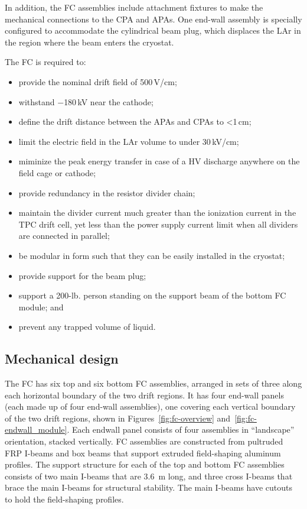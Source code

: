 In addition, the FC assemblies include attachment fixtures to make the mechanical connections to the CPA and APAs.
One end-wall assembly is specially configured to accommodate the
cylindrical beam plug, which displaces the LAr in the region where the beam enters the cryostat.

The FC is required to:
\begin{itemize}
\item provide the nominal drift field of 500\,V/cm;
\item withstand $-$180\,kV near the cathode;
\item define the drift distance between the APAs and CPAs to <1\,cm;
\item limit the electric field in the LAr volume to under 30\,kV/cm;
\item miminize the peak energy transfer in case of a HV discharge anywhere on the field cage or cathode;
\item provide redundancy in the resistor divider chain;
\item maintain the divider current much greater than the ionization current in the TPC drift cell, yet less than the power supply current limit when all dividers are connected in parallel;
\item be modular in form such that they can be easily installed in the cryostat;
\item provide support for the beam plug; 
\item support a 200-lb. person standing on the support beam of the bottom FC module; and
\item prevent any trapped volume of liquid.
\end{itemize}

\subsection{Mechanical design}

The FC has six top and six bottom FC assemblies, arranged in sets of three along each horizontal boundary of the two drift regions. It has 
four end-wall panels (each made up of four end-wall assemblies), one covering each vertical boundary of the two drift regions, shown in Figures~\ref{fig:fc-overview} and~\ref{fig:fc-endwall_module}.
Each endwall panel consists of four assemblies in ``landscape'' orientation, stacked vertically.
FC assemblies are constructed from pultruded FRP I-beams and box beams that support extruded field-shaping aluminum profiles. The support structure for each of the top and bottom FC assemblies consists of two main I-beams that are 3.6~m long, and three cross I-beams that brace the main I-beams for structural stability. The main I-beams have cutouts to hold the field-shaping profiles. 

